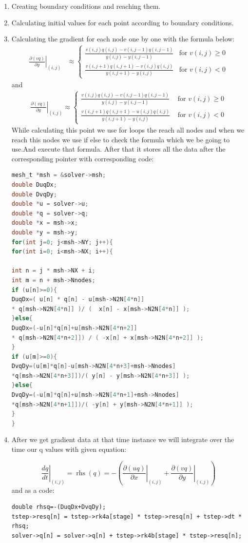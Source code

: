 \documentclass{report}
\begin{document}
\begin{enumerate}
    \item Creating boundary conditions and reaching them.
    \item Calculating initial values for each point according to boundary conditions.
    \item Calculating the gradient for each node one by one with the formula below:
    \begin{align}
\left.\frac{\partial(v q)}{\partial y}\right|_{(i, j)} &\approx 
\begin{cases}
    \frac{v(i, j) q(i, j) - v(i, j-1) q(i, j-1)}{y(i, j) - y(i, j-1)} & \text{for } v(i, j) \geq 0 \\
    \frac{v(i, j+1) q(i, j+1) - v(i, j) q(i, j)}{y(i, j+1) - y(i, j)} & \text{for } v(i, j) < 0
\end{cases}
\end{align}
and 
\begin{align}
\left.\frac{\partial(v q)}{\partial y}\right|_{(i, j)} \approx 
\begin{cases}\frac{v(i, j) q(i, j)-v(i, j-1) q(i, j-1)}{y(i, j)-y(i, j-1)} & \text { for } v(i, j) \geq 0 \\ \frac{v(i, j+1) q(i, j+1)-u(i, j) q(i, j)}{y(i, j+1)-y(i, j)} & \text { for } v(i, j)<0\end{cases}
\end{align}
While calculating this point we use for loops the reach all nodes and when we reach this nodes we use if else to check the formula which we be going to use.And execute that formula. After that it stores all the data after the corresponding pointer with corresponding code:
 \pagebreak
  \begin{lstlisting}[language=C, caption={Gradient calculations}, label={yourlabel}]
mesh_t *msh = &solver->msh;
double DuqDx;
double DvqDy;
double *u = solver->u;
double *q = solver->q;
double *x = msh->x;
double *y = msh->y;
for(int j=0; j<msh->NY; j++){
for(int i=0; i<msh->NX; i++){
      
int n = j * msh->NX + i;
int m = n + msh->Nnodes;
if (u[n]>=0){
DuqDx=( u[n] * q[n] - u[msh->N2N[4*n]] 
* q[msh->N2N[4*n]] )/ (  x[n] - x[msh->N2N[4*n]] );
}else{ 
DuqDx=(-u[n]*q[n]+u[msh->N2N[4*n+2]]
* q[msh->N2N[4*n+2]]) / ( -x[n] + x[msh->N2N[4*n+2]] );
}
if (u[m]>=0){
DvqDy=(u[m]*q[n]-u[msh->N2N[4*n+3]+msh->Nnodes]
*q[msh->N2N[4*n+3]])/( y[n] - y[msh->N2N[4*n+3]] );
}else{ 
DvqDy=(-u[m]*q[n]+u[msh->N2N[4*n+1]+msh->Nnodes]
*q[msh->N2N[4*n+1]])/( -y[n] + y[msh->N2N[4*n+1]] );
}
}
\end{lstlisting}
 \item After we get gradient data at that time instance we will integrate over the time  our q values with given equation:

$$
\left.\frac{d q}{d t}\right|_{(i, j)}=\operatorname{rhs}(q)=-\left(\left.\frac{\partial(u q)}{\partial x}\right|_{(i, j)}+\left.\frac{\partial(v q)}{\partial y}\right|_{(i, j)}\right)
$$
and as a code:
\begin{verbatim}
double rhsq=-(DuqDx+DvqDy);
tstep->resq[n] = tstep->rk4a[stage] * tstep->resq[n] + tstep->dt * rhsq;
solver->q[n] = solver->q[n] + tstep->rk4b[stage] * tstep->resq[n];
\end{verbatim}
\end{enumerate}
\pagebreak
\end{document}
